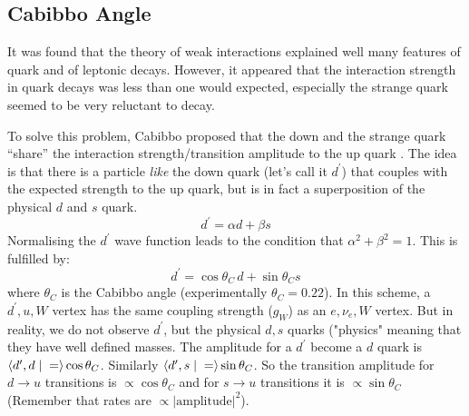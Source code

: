 


\subsection{Cabibbo Angle}
 It was found that the 
 theory of weak interactions explained well many features of quark and
 of leptonic decays. However, it appeared that the interaction
 strength in quark decays was less than one would expected, especially
 the strange quark seemed to be very reluctant to decay.

 To solve this problem, Cabibbo proposed that the down and the strange
 quark ``share'' the interaction strength/transition amplitude to the
 up quark \cite{cabibbo}. The idea is that there is a particle
 \emph{like} the down quark (let's call it $d^{\prime}$) that couples
 with the expected strength to the up quark, but is in fact a
 superposition of the physical $d$ and $s$ quark.
 \begin{equation}
     d^{\prime} = \alpha d + \beta s
 \end{equation}
 Normalising the $d^{\prime}$ wave function leads to the condition that $\alpha^2 + \beta^2=1$. This is fulfilled by:
 \begin{equation}
 d^{\prime} = \cos\theta_C \, d + \sin\theta_C s
\end{equation}
where $\theta_C$ is the Cabibbo angle (experimentally $\theta_C = 0.22$).
In this scheme, a $d^{\prime}, u, W$ vertex has the same coupling strength ($g_W$) as an $e, \nu_e, W$ vertex. 
But in reality, we do not observe $d^{\prime}$, but the physical $d, s$ quarks ("physics" meaning that they have well defined masses. 
The amplitude for a $d^{\prime}$ become a $d$ quark is $ \left< d^{\prime}, d\; |\; = \right> \cos\theta_C$. Similarly $ \left< d^{\prime}, s\; |\; = \right> \sin\theta_C$.
 So the transition amplitude for $d \to u$ transitions is $\propto
 \cos\theta_C$ and for $s\to u$ transitions it is $\propto \sin\theta_C$
 (Remember that rates are $\propto |\mathrm{amplitude}|^2$).
 
